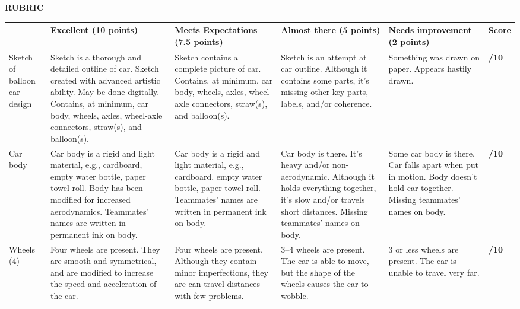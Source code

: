 \documentclass{article}
\begin{document}
\begin{center}
\textbf{RUBRIC}
\vspace{1ex}

\scriptsize
    \begin{tabular}{|p{2cm}|p{5cm}|p{5cm}|p{5cm}|p{3cm}|p{1.5cm}|}
    \hline
         & \textbf{Excellent} (10 points) & {\centering \textbf{Meets Expectations} (7.5 points)} & {\centering \textbf{Almost there} (5 points)} & {\centering \textbf{Needs improvement} (2 points)} & {\centering \textbf{Score}}\\
         \hline
        Sketch of balloon car design
        & Sketch is a thorough and detailed outline of car. Sketch created with advanced artistic ability. May be done digitally. Contains, at minimum, car body, wheels, axles, wheel-axle connectors, straw(s), and balloon(s). & Sketch contains a complete picture of car. Contains, at minimum, car body, wheels, axles, wheel-axle connectors, straw(s), and balloon(s). & Sketch is an attempt at car outline. Although it contains some parts, it's missing other key parts, labels, and/or coherence. & Something was drawn on paper. Appears hastily drawn. &  \hspace{2em} \textbf{/10}\\ \hline
        Car body & 
        Car body is a rigid and light material, e.g., cardboard, empty water bottle, paper towel roll. Body has been modified for increased aerodynamics. Teammates' names are written in permanent ink on body. & 
        Car body is a rigid and light material, e.g., cardboard, empty water bottle, paper towel roll. Teammates' names are written in permanent ink on body. & 
        Car body is there. It's heavy and/or non-aerodynamic. Although it holds everything together, it's slow and/or travels short distances. Missing teammates' names on body. & 
        Some car body is there. Car falls apart when put in motion. Body doesn't hold car together. Missing teammates' names on body. & \hspace{2em} \textbf{/10}\\ \hline
        Wheels (4) & Four wheels are present. They are smooth and symmetrical, and are modified to increase the speed and acceleration of the car. & Four wheels are present. Although they contain minor imperfections, they are can travel distances with few problems. & 3--4 wheels are present. The car is able to move, but the shape of the wheels causes the car to wobble. & 3 or less wheels are present. The car is unable to travel very far. & \hspace{2em} \textbf{/10}\\ \hline

\end{tabular}
\end{center}
\end{document}

